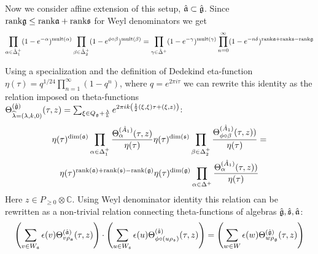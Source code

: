 Now we consider affine extension of this setup, $\hat{\mathfrak{a}}\subset\hat{\mathfrak{g}}$. Since $\mathrm{rank}\mathfrak{g}\leq
\mathrm{rank} \mathfrak{a}+\mathrm{rank}\mathfrak{s}$ for Weyl denominators we get
 \[
\prod_{\alpha\in\hat{\Delta}^{+}_{1}}(1-e^{-\alpha})^{\mathrm{mult}(\alpha)}\prod_{\beta\in\hat{\Delta}^{+}_{2}}(1-e^{\phi\circ \beta})^{\mathrm{mult}(\beta)}=\prod_{\gamma\in\hat{\Delta}^{+}}(1-e^{-\gamma})^{\mathrm{mult}(\gamma)}\prod_{n=0}^{\infty}(1-e^{-n\delta})^{\mathrm{rank}\mathfrak{a}+\mathrm{rank}\mathfrak{s}-\mathrm{rank}\mathfrak{g}}
\]

Using a specialization
\cite{kac1988modular,kac1984infinite,kac1990idl} and the
definition of Dedekind eta-function
$\eta(\tau)=q^{1/24}\prod_{n=1}^{\infty}(1-q^{n})$, where
$q=e^{2\pi i \tau}$ we can rewrite this identity as the relation
imposed on theta-functions $\Theta^{(\hat{\mathfrak{g}})}_{\widehat{\lambda}=(\lambda,k,0)}(\tau,z)=\sum_{\xi\in Q_{\mathfrak{g}}+\frac{\lambda}{k}}e^{2\pi i k \left(\frac{1}{2} (\xi,\xi) \tau + (\xi,z)\right)}$:
\begin{multline}
  \label{eq:135}
  \eta(\tau)^{\mathrm{dim}(\mathfrak{a})}\prod_{\alpha\in\Delta_{1}^{+}}\frac{\Theta^{(\hat A_{1})}_{\alpha}(\tau,z)}{\eta(\tau)} \eta(\tau)^{\mathrm{dim}(\mathfrak{s})}\prod_{\beta\in\Delta_{2}^{+}}\frac{\Theta^{(\hat A_{1})}_{\phi\circ \beta}(\tau,z))}{\eta(\tau)}=\\
\eta(\tau)^{\mathrm{rank}(\mathfrak{a})+\mathrm{rank}(\mathfrak{s})-\mathrm{rank}(\mathfrak{g})}
\eta(\tau)^{\mathrm{dim}(\mathfrak{g})}\prod_{\alpha\in\Delta^{+}}\frac{\Theta^{(\hat A_{1})}_{\alpha}(\tau,z))}{\eta(\tau)}
\end{multline}
Here $z\in P_{\geq 0}\otimes \mathbb{C}$. Using Weyl denominator identity this relation can be
rewritten as a non-trivial relation connecting theta-functions of algebras $\hat{\mathfrak{g}},\hat{\mathfrak{s}},\hat{\mathfrak{a}}$:
\begin{equation}
  \label{eq:143}
  \left(\sum_{v\in W_{\mathfrak{a}}}\epsilon(v) \Theta^{(\hat{\mathfrak{a}})}_{v\rho_{\mathfrak{a}}}(\tau,z)\right)
  \cdot \left(\sum_{u\in W_{\mathfrak{s}}}\epsilon(u) \Theta^{(\hat{\mathfrak{s}})}_{\phi\circ(u\rho_{\mathfrak{s}})}(\tau,z)\right)= 
  \left(\sum_{w\in W}\epsilon(w) \Theta^{(\hat{\mathfrak{g}})}_{w\rho_{\mathfrak{g}}}(\tau,z)\right)
\end{equation}

